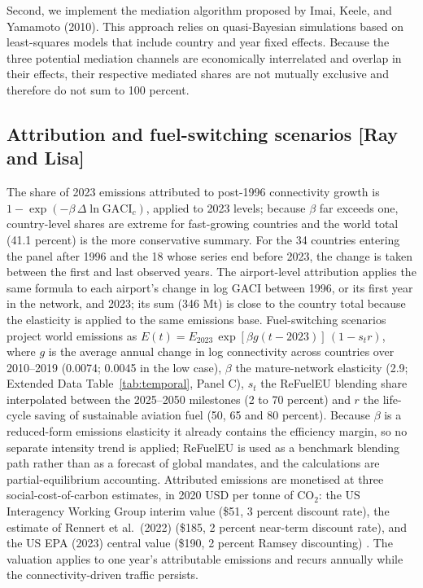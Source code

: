 \documentclass[12pt]{extarticle}
\begin{document}
Second, we implement the mediation algorithm proposed by Imai, Keele, and Yamamoto (2010). This approach relies on quasi-Bayesian simulations based on least-squares models that include country and year fixed effects. Because the three potential mediation channels are economically interrelated and overlap in their effects, their respective mediated shares are not mutually exclusive and therefore do not sum to 100 percent.



\subsection*{Attribution and fuel-switching scenarios [Ray and Lisa]}
The share of 2023 emissions attributed to post-1996 connectivity growth is
$1 - \exp(-\beta\,\Delta \ln \mathrm{GACI}_c)$, applied to 2023 levels;
because $\beta$ far exceeds one, country-level shares are extreme for
fast-growing countries and the world total (41.1 percent) is the more
conservative summary. For the 34 countries entering the panel after 1996 and the 18 whose series end before 2023, the change is taken between the first and last observed years. The airport-level attribution applies the same
formula to each airport's change in log GACI between 1996, or its first
year in the network, and 2023; its sum (346 Mt) is close to the country
total because the elasticity is applied to the same emissions base. Fuel-switching scenarios project world emissions as
$E(t) = E_{2023}\,\exp[\beta g (t-2023)]\,(1 - s_t r)$, where $g$ is the
average annual change in log connectivity across countries over
2010--2019 (0.0074; 0.0045 in the low case), $\beta$ the mature-network
elasticity (2.9; Extended Data Table~\ref{tab:temporal}, Panel C), $s_t$
the ReFuelEU blending share interpolated between the 2025--2050 milestones
(2 to 70 percent) and $r$ the life-cycle saving of sustainable aviation
fuel (50, 65 and 80 percent). Because $\beta$ is a reduced-form emissions
elasticity it already contains the efficiency margin, so no separate
intensity trend is applied; ReFuelEU is used as a benchmark blending path
rather than as a forecast of global mandates, and the calculations are
partial-equilibrium accounting. Attributed emissions are monetised at three
social-cost-of-carbon estimates, in 2020 USD per tonne of CO$_2$: the US
Interagency Working Group interim value (\$51, 3 percent discount rate),
the estimate of Rennert et al.\ (2022) (\$185, 2 percent near-term
discount rate), and the US EPA (2023) central value (\$190, 2 percent
Ramsey discounting) \citep{iwg2021,rennert2022,epa2023}. The valuation applies to one year's
attributable emissions and recurs annually while the connectivity-driven
traffic persists.
\end{document}
